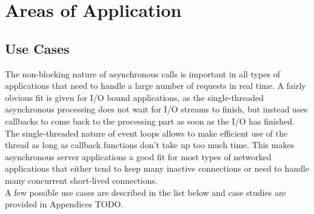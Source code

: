 \newpage
\section{Areas of Application}
\label{areas_of_application}

\subsection{Use Cases}
\label{use_cases}
The non-blocking nature of asynchronous calls is important in all types of
applications that need to handle a large number of requests in real time.
A fairly obvious fit is given for I/O bound applications, as the single-threaded asynchronous processing
does not wait for I/O streams to finish, but instead uses callbacks to come back to the processing part
as soon as the I/O has finished.
The single-threaded nature of event loops allows to make efficient use of the
thread as long as callback functions don't take up too much time. This makes asynchronous
server applications a good fit for most types of networked applications that
either tend to keep many inactive connections or need to handle many concurrent 
short-lived connections.\\

A few possible use cases are described in the list below and case studies are provided in Appendices TODO.

